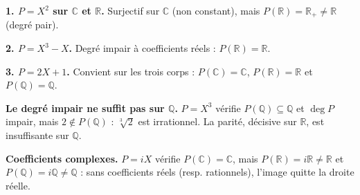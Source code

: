\decsep{}



\begin{mdframed}[style=exbar]
  \textbf{1. $P = X^2$ sur $\mathbb{C}$ et $\mathbb{R}$.}\enspace%
  Surjectif sur $\mathbb{C}$ (non constant), mais $P(\mathbb{R}) = \mathbb{R}_+ \neq \mathbb{R}$
  (degré pair).

  \smallskip\noindent
  \textbf{2. $P = X^3 - X$.}\enspace%
  Degré impair à coefficients réels : $P(\mathbb{R}) = \mathbb{R}$.

  \smallskip\noindent
  \textbf{3. $P = 2X + 1$.}\enspace%
  Convient sur les trois corps : $P(\mathbb{C})=\mathbb{C}$, $P(\mathbb{R})=\mathbb{R}$
  et $P(\mathbb{Q})=\mathbb{Q}$.
\end{mdframed}


\begin{mdframed}[style=cexbar]
  \textbf{Le degré impair ne suffit pas sur $\mathbb{Q}$.}\enspace%
  $P = X^3$ vérifie $P(\mathbb{Q}) \subseteq \mathbb{Q}$ et $\deg P$ impair,
  mais $2 \notin P(\mathbb{Q})$ : $\sqrt[3]{2}$ est irrationnel. La parité,
  décisive sur $\mathbb{R}$, est insuffisante sur $\mathbb{Q}$.

  \smallskip\noindent
  \textbf{Coefficients complexes.}\enspace%
  $P = iX$ vérifie $P(\mathbb{C}) = \mathbb{C}$, mais $P(\mathbb{R}) = i\mathbb{R} \neq \mathbb{R}$
  et $P(\mathbb{Q}) = i\mathbb{Q} \neq \mathbb{Q}$ : sans coefficients réels
  (resp. rationnels), l'image quitte la droite réelle.
\end{mdframed}

\exolabel

